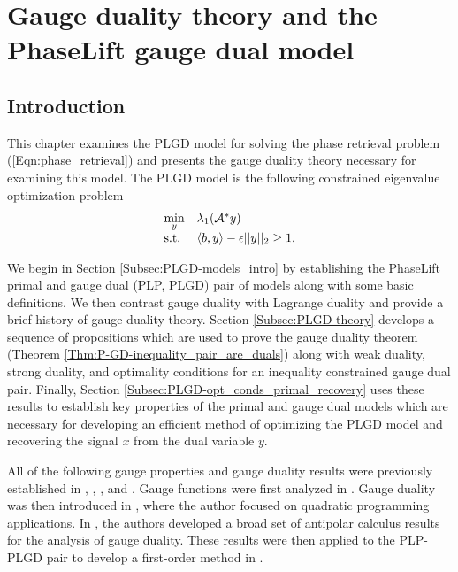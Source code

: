 \chapter{Gauge duality theory and the PhaseLift gauge dual model}	\label{Sec:PLGD}


\section{Introduction} 	\label{Subsec:PLGD-intro}

This chapter examines the PLGD model for solving the phase retrieval problem (\ref{Eqn:phase_retrieval}) and presents the gauge duality theory necessary for examining this model.  The PLGD model is the following constrained eigenvalue optimization problem
\begin{equation}
\begin{array}{ll}
	\min\limits_{\substack{y}}
					&	\lambda_1({\mathcal A}^* y)
						\\
	\textnormal{s.t.}
					&	\langle b, y \rangle - \epsilon ||y||_2 \geq 1.
\end{array}
\end{equation}


We begin in Section \ref{Subsec:PLGD-models_intro} by establishing the PhaseLift primal and gauge dual (PLP, PLGD) pair of models along with some basic definitions. We then contrast gauge duality with Lagrange duality and provide a brief history of gauge duality theory.  Section \ref{Subsec:PLGD-theory} develops a sequence of propositions which are used to prove the gauge duality theorem (Theorem \ref{Thm:P-GD-inequality_pair_are_duals}) along with weak duality, strong duality, and optimality conditions for an inequality constrained gauge dual pair.  Finally, Section \ref{Subsec:PLGD-opt_conds_primal_recovery} uses these results to establish key properties of the primal and gauge dual models which are necessary for developing an efficient method of optimizing the PLGD model and recovering the signal $x$ from the dual variable $y$.  

All of the following gauge properties and gauge duality results were previously established in \cite{rockafellar1970convex}, \cite{DBLP:journals/mp/Freund87}, \cite{DBLP:journals/siamjo/FriedlanderMP14}, and \cite{DBLP:journals/siamsc/FriedlanderM16}.  Gauge functions were first analyzed in  \cite{rockafellar1970convex}.  Gauge duality was then introduced in \cite{DBLP:journals/mp/Freund87}, where the author focused on quadratic programming applications.  In \cite{DBLP:journals/siamjo/FriedlanderMP14}, the authors developed a broad set of antipolar calculus results for the analysis of gauge duality.  These results were then applied to the PLP-PLGD pair to develop a first-order method in \cite{DBLP:journals/siamsc/FriedlanderM16}.



